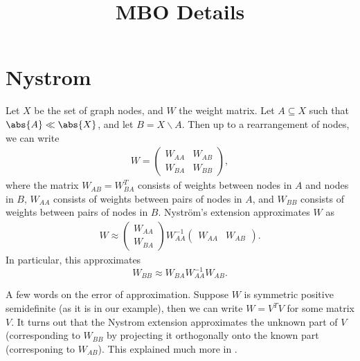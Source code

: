 \documentclass[12pt]{article}
\title{MBO Details}
\author{}
\date{}
\begin{document}
\maketitle
\section{Nystrom}
\cite{Fowlkes04, Merkurjev13, Woodworth13} Let $X$ be the set of graph nodes,
and $W$ the weight matrix. Let $A\subseteq X$ such that $\abs{A} \ll \abs{X}$,
and let $B = X\backslash A$. Then up to a rearrangement of nodes, we can write
\begin{align}
  W = \begin{pmatrix} W_{AA} & W_{AB} \\ W_{BA} & W_{BB}
  \end{pmatrix},
\end{align}
where the matrix $W_{AB} = W_{BA}^T$ consists of weights between nodes in $A$
and nodes in $B$, $W_{AA}$ consists of weights between pairs of nodes in $A$,
and $W_{BB}$ consists of weights between pairs of nodes in $B$. Nystr\"{o}m's
extension approximates $W$ as
\begin{align}
  W \approx \begin{pmatrix} W_{AA} \\ W_{BA} \end{pmatrix}
  W_{AA}^{-1} \begin{pmatrix} W_{AA} & W_{AB}\end{pmatrix}.
\end{align}
In particular, this approximates
\[W_{BB} \approx W_{BA}W_{AA}^{-1}W_{AB}.\]

A few words on the error of approximation. Suppose $W$ is symmetric positive semidefinite (as it is in our example), then we can write $W = V^TV$ for some matrix $V$. It turns out that the Nystrom extension approximates the unknown part of $V$ (corresponding to $W_{BB}$ by projecting it orthogonally onto the known part (corresponing to $W_{AB}$). This explained much more in \cite{Fowlkes04}.
\end{document}
